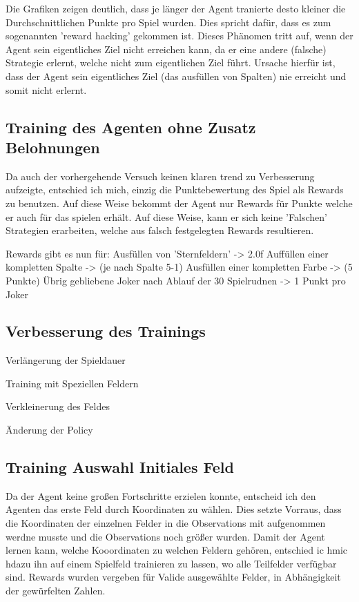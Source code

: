 Die Grafiken zeigen deutlich, dass je länger der Agent tranierte desto kleiner die Durchschnittlichen Punkte pro Spiel wurden.
Dies spricht dafür, dass es zum sogenannten 'reward hacking' gekommen ist. Dieses Phänomen tritt auf, wenn der Agent sein eigentliches Ziel nicht erreichen kann, da er eine andere (falsche) Strategie erlernt, welche nicht zum eigentlichen Ziel führt. Ursache hierfür ist, dass der Agent sein eigentliches Ziel (das ausfüllen von Spalten) nie erreicht und somit nicht erlernt.



\subsection{Training des Agenten ohne Zusatz Belohnungen}
Da auch der vorhergehende Versuch keinen klaren trend zu Verbesserung aufzeigte, entschied ich mich, einzig die Punktebewertung des Spiel als Rewards zu benutzen.
Auf diese Weise bekommt der Agent nur Rewards für Punkte welche er auch für das spielen erhält. Auf diese Weise, kann er sich keine 'Falschen' Strategien erarbeiten, welche aus falsch festgelegten Rewards resultieren.

Rewards gibt es nun für:
Ausfüllen von 'Sternfeldern' -> 2.0f
Auffüllen einer kompletten Spalte -> (je nach Spalte 5-1)
Ausfüllen einer kompletten Farbe -> (5 Punkte)
Übrig gebliebene Joker nach Ablauf der 30 Spielrudnen -> 1 Punkt pro Joker

\subsection{Verbesserung des Trainings}
Verlängerung der Spieldauer

Training mit Speziellen Feldern

Verkleinerung des Feldes

Änderung der Policy

\subsection{Training Auswahl Initiales Feld}
Da der Agent keine großen Fortschritte erzielen konnte, entscheid ich den Agenten das erste Feld durch Koordinaten zu wählen.
Dies setzte Vorraus, dass die Koordinaten der einzelnen Felder in die Observations mit aufgenommen werdne musste und die Observations noch größer wurden.
Damit der Agent lernen kann, welche Kooordinaten zu welchen Feldern gehören, entschied ic hmic hdazu ihn auf einem Spielfeld trainieren zu lassen, wo alle Teilfelder verfügbar sind.
Rewards wurden vergeben für Valide ausgewählte Felder, in Abhängigkeit der gewürfelten Zahlen.

